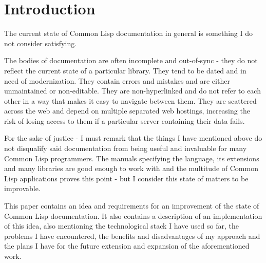 \section{Introduction}

The current state of Common Lisp documentation in general is something I do not consider satisfying.

The bodies of documentation are often incomplete and out-of-sync - they do not reflect the current state of a particular library. They tend to be dated and in need of modernization. They contain errors and mistakes and are either unmaintained or non-editable. They are non-hyperlinked and do not refer to each other in a way that makes it easy to navigate between them. They are scattered across the web and depend on multiple separated web hostings, increasing the risk of losing access to them if a particular server containing their data fails.

For the sake of justice - I must remark that the things I have mentioned above do not disqualify said documentation from being useful and invaluable for many Common Lisp programmers. The manuals specifying the language, its extensions and many libraries are good enough to work with and the multitude of Common Lisp applications proves this point - but I consider this state of matters to be improvable.

This paper contains an idea and requirements for an improvement of the state of Common Lisp documentation. It also contains a description of an implementation of this idea, also mentioning the technological stack I have used so far, the problems I have encountered, the benefits and disadvantages of my approach and the plans I have for the future extension and expansion of the aforementioned work.